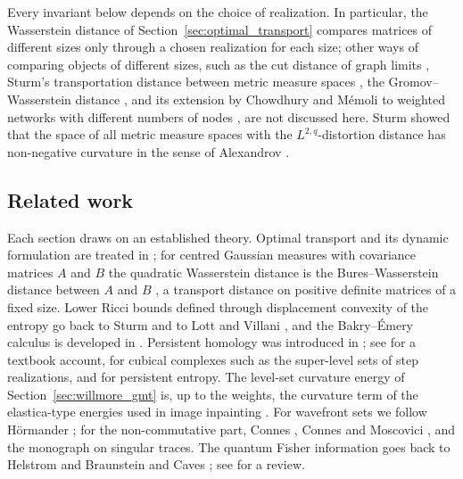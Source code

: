 \documentclass[11pt,a4paper,reqno]{amsart}
\theoremstyle{definition}
\numberwithin{equation}{section}
\begin{document}
Every invariant below depends on the choice of realization. In particular, the Wasserstein distance of Section~\ref{sec:optimal_transport} compares matrices of different sizes only through a chosen realization for each size; other ways of comparing objects of different sizes, such as the cut distance of graph limits \cite{lovasz2012large}, Sturm's transportation distance between metric measure spaces \cite{sturm2006geometryI}, the Gromov--Wasserstein distance \cite{memoli2011gromov}, and its extension by Chowdhury and M\'emoli to weighted networks with different numbers of nodes \cite{chowdhury2019gromov}, are not discussed here. Sturm showed that the space of all metric measure spaces with the $L^{2,q}$-distortion distance has non-negative curvature in the sense of Alexandrov \cite{sturm2023space}.

\subsection*{Related work}
Each section draws on an established theory. Optimal transport and its dynamic formulation are treated in \cite{villani2009optimal,ambrosio2008gradient,benamou2000computational}; for centred Gaussian measures with covariance matrices $A$ and $B$ the quadratic Wasserstein distance is the Bures--Wasserstein distance between $A$ and $B$ \cite{bhatia2019bures}, a transport distance on positive definite matrices of a fixed size. Lower Ricci bounds defined through displacement convexity of the entropy go back to Sturm and to Lott and Villani \cite{sturm2006geometryI,sturm2006geometryII,lott2009ricci}, and the Bakry--\'Emery calculus is developed in \cite{bakry1985diffusions,bakry2014analysis}. Persistent homology was introduced in \cite{edelsbrunner2002topological,zomorodian2005computing}; see \cite{edelsbrunner2010computational} for a textbook account, \cite{kaczynski2004computational,wagner2012efficient} for cubical complexes such as the super-level sets of step realizations, and \cite{chintakunta2015entropy,atienza2020stability} for persistent entropy. The level-set curvature energy of Section~\ref{sec:willmore_gmt} is, up to the weights, the curvature term of the elastica-type energies used in image inpainting \cite{chan2003euler,ambrosio2003direct}. For wavefront sets we follow H\"ormander \cite{hormander2003analysis}; for the non-commutative part, Connes \cite{connes1985noncommutative,connes1988action,connes1994noncommutative}, Connes and Moscovici \cite{connes1995local}, and the monograph \cite{lord2013singular} on singular traces. The quantum Fisher information goes back to Helstrom \cite{helstrom1967minimum} and Braunstein and Caves \cite{braunstein1994statistical}; see \cite{liu2020quantum} for a review.
\end{document}
